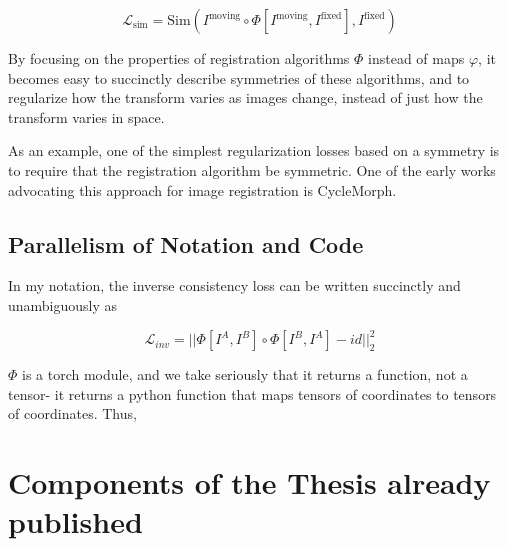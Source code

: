 \documentclass{article}
\begin{document}
$$ \mathcal{L}_\text{sim} = \text{Sim}(I^\text{moving} \circ  \Phi[I^\text{moving}, I^\text{fixed}] , I^\text{fixed}) $$

By focusing on the properties of registration algorithms $\Phi$ instead of maps
$\varphi$, it becomes easy to succinctly describe symmetries of these
algorithms, and to regularize how the transform varies as images change,
instead of just how the transform varies in space.

As an example, one of the simplest regularization losses based on a symmetry is
to require that the registration algorithm be symmetric. One of the early works
advocating this approach for image registration is CycleMorph.

\subsection{Parallelism of Notation and Code}

In my notation, the inverse consistency loss can be written succinctly and
unambiguously as

$$ \mathcal{L}_{inv} = ||\Phi[I^A, I^B] \circ \Phi[I^B, I^A] - id||^2_2$$

$\Phi$ is a torch module, and we take seriously that it returns a function, not a tensor- it returns a python function that maps tensors of coordinates to tensors of coordinates. Thus,


\section{Components of the Thesis already published}
\end{document}
